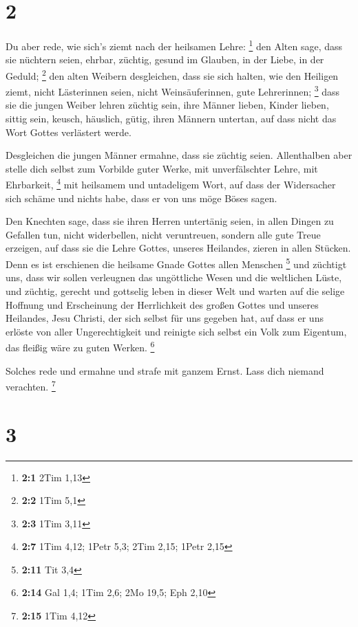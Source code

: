 \hypertarget{section-1}{%
\section{2}\label{section-1}}

 Du aber rede, wie sich's ziemt nach der heilsamen Lehre:
\footnote{\textbf{2:1} 2Tim 1,13}  den Alten sage, dass
sie nüchtern seien, ehrbar, züchtig, gesund im Glauben, in der Liebe, in
der Geduld; \footnote{\textbf{2:2} 1Tim 5,1}  den alten
Weibern desgleichen, dass sie sich halten, wie den Heiligen ziemt, nicht
Lästerinnen seien, nicht Weinsäuferinnen, gute Lehrerinnen; \footnote{\textbf{2:3}
  1Tim 3,11}  dass sie die jungen Weiber lehren züchtig
sein, ihre Männer lieben, Kinder lieben,  sittig sein,
keusch, häuslich, gütig, ihren Männern untertan, auf dass nicht das Wort
Gottes verlästert werde.

 Desgleichen die jungen Männer ermahne, dass sie züchtig
seien.  Allenthalben aber stelle dich selbst zum Vorbilde
guter Werke, mit unverfälschter Lehre, mit Ehrbarkeit, \footnote{\textbf{2:7}
  1Tim 4,12; 1Petr 5,3; 2Tim 2,15; 1Petr 2,15}  mit
heilsamem und untadeligem Wort, auf dass der Widersacher sich schäme und
nichts habe, dass er von uns möge Böses sagen.

 Den Knechten sage, dass sie ihren Herren untertänig
seien, in allen Dingen zu Gefallen tun, nicht widerbellen,
 nicht veruntreuen, sondern alle gute Treue erzeigen, auf
dass sie die Lehre Gottes, unseres Heilandes, zieren in allen Stücken.
 Denn es ist erschienen die heilsame Gnade Gottes allen
Menschen \footnote{\textbf{2:11} Tit 3,4}  und züchtigt
uns, dass wir sollen verleugnen das ungöttliche Wesen und die weltlichen
Lüste, und züchtig, gerecht und gottselig leben in dieser Welt
 und warten auf die selige Hoffnung und Erscheinung der
Herrlichkeit des großen Gottes und unseres Heilandes, Jesu Christi,
 der sich selbst für uns gegeben hat, auf dass er uns
erlöste von aller Ungerechtigkeit und reinigte sich selbst ein Volk zum
Eigentum, das fleißig wäre zu guten Werken. \footnote{\textbf{2:14} Gal
  1,4; 1Tim 2,6; 2Mo 19,5; Eph 2,10}

 Solches rede und ermahne und strafe mit ganzem Ernst.
Lass dich niemand verachten. \footnote{\textbf{2:15} 1Tim 4,12}

\hypertarget{section-2}{%
\section{3}\label{section-2}}

